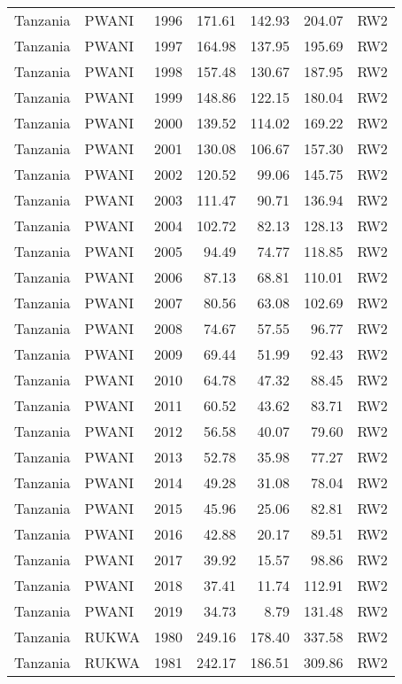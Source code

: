 \begin{longtable}{lllrrrl}
  Tanzania & PWANI & 1996 & 171.61 & 142.93 & 204.07 & RW2 \\ 
  Tanzania & PWANI & 1997 & 164.98 & 137.95 & 195.69 & RW2 \\ 
  Tanzania & PWANI & 1998 & 157.48 & 130.67 & 187.95 & RW2 \\ 
  Tanzania & PWANI & 1999 & 148.86 & 122.15 & 180.04 & RW2 \\ 
  Tanzania & PWANI & 2000 & 139.52 & 114.02 & 169.22 & RW2 \\ 
  Tanzania & PWANI & 2001 & 130.08 & 106.67 & 157.30 & RW2 \\ 
  Tanzania & PWANI & 2002 & 120.52 & 99.06 & 145.75 & RW2 \\ 
  Tanzania & PWANI & 2003 & 111.47 & 90.71 & 136.94 & RW2 \\ 
  Tanzania & PWANI & 2004 & 102.72 & 82.13 & 128.13 & RW2 \\ 
  Tanzania & PWANI & 2005 & 94.49 & 74.77 & 118.85 & RW2 \\ 
  Tanzania & PWANI & 2006 & 87.13 & 68.81 & 110.01 & RW2 \\ 
  Tanzania & PWANI & 2007 & 80.56 & 63.08 & 102.69 & RW2 \\ 
  Tanzania & PWANI & 2008 & 74.67 & 57.55 & 96.77 & RW2 \\ 
  Tanzania & PWANI & 2009 & 69.44 & 51.99 & 92.43 & RW2 \\ 
  Tanzania & PWANI & 2010 & 64.78 & 47.32 & 88.45 & RW2 \\ 
  Tanzania & PWANI & 2011 & 60.52 & 43.62 & 83.71 & RW2 \\ 
  Tanzania & PWANI & 2012 & 56.58 & 40.07 & 79.60 & RW2 \\ 
  Tanzania & PWANI & 2013 & 52.78 & 35.98 & 77.27 & RW2 \\ 
  Tanzania & PWANI & 2014 & 49.28 & 31.08 & 78.04 & RW2 \\ 
  Tanzania & PWANI & 2015 & 45.96 & 25.06 & 82.81 & RW2 \\ 
  Tanzania & PWANI & 2016 & 42.88 & 20.17 & 89.51 & RW2 \\ 
  Tanzania & PWANI & 2017 & 39.92 & 15.57 & 98.86 & RW2 \\ 
  Tanzania & PWANI & 2018 & 37.41 & 11.74 & 112.91 & RW2 \\ 
  Tanzania & PWANI & 2019 & 34.73 & 8.79 & 131.48 & RW2 \\ 
  Tanzania & RUKWA & 1980 & 249.16 & 178.40 & 337.58 & RW2 \\ 
  Tanzania & RUKWA & 1981 & 242.17 & 186.51 & 309.86 & RW2 \\ 

\end{longtable}
